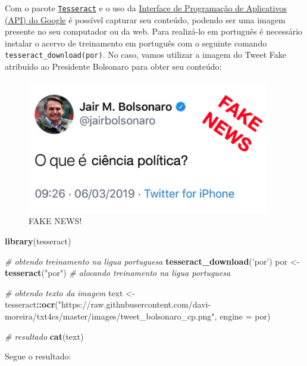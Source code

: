 \documentclass[]{book}
\newenvironment{Shaded}{\begin{snugshade}}{\end{snugshade}}
\newcommand{\CommentTok}[1]{\textcolor[rgb]{0.56,0.35,0.01}{\textit{#1}}}
\newcommand{\DataTypeTok}[1]{\textcolor[rgb]{0.13,0.29,0.53}{#1}}
\newcommand{\KeywordTok}[1]{\textcolor[rgb]{0.13,0.29,0.53}{\textbf{#1}}}
\newcommand{\NormalTok}[1]{#1}
\newcommand{\OperatorTok}[1]{\textcolor[rgb]{0.81,0.36,0.00}{\textbf{#1}}}
\newcommand{\StringTok}[1]{\textcolor[rgb]{0.31,0.60,0.02}{#1}}
\begin{document}
Com o pacote \href{https://cran.r-project.org/web/packages/tesseract/vignettes/intro.html}{\texttt{Tesseract}} e
o uso da \href{https://cloud.google.com/vision/}{Interface de Programação de Aplicativos (API) do Google} é
possível capturar seu conteúdo, podendo ser uma imagem presente no seu computador ou da
web. Para realizá-lo em português é necessário instalar o acervo de treinamento em português
com o seguinte comando \texttt{tesseract\_download(\textquotesingle{}por\textquotesingle{})}. No caso, vamos utilizar a imagem do Tweet Fake
atribuído ao Presidente Bolsonaro para obter seu conteúdo:

\begin{figure}
\centering
\includegraphics[width=4.16667in,height=\textheight]{images/tweet_bolsonaro_cp.png}
\caption{FAKE NEWS!}
\end{figure}

\begin{Shaded}
\begin{Highlighting}[]
\KeywordTok{library}\NormalTok{(tesseract)}

\CommentTok{# obtendo treinamento na ligua portuguesa}
\KeywordTok{tesseract_download}\NormalTok{(}\StringTok{'por'}\NormalTok{)}
\NormalTok{por <-}\StringTok{ }\KeywordTok{tesseract}\NormalTok{(}\StringTok{"por"}\NormalTok{) }\CommentTok{# alocando treinamento na ligua portuguesa}

\CommentTok{# obtendo texto da imagem}
\NormalTok{text <-}\StringTok{ }\NormalTok{tesseract}\OperatorTok{::}\KeywordTok{ocr}\NormalTok{(}\StringTok{"https://raw.githubusercontent.com/davi-moreira/txt4cs/master/images/tweet_bolsonaro_cp.png"}\NormalTok{, }\DataTypeTok{engine =}\NormalTok{ por)}

\CommentTok{# resultado}
\KeywordTok{cat}\NormalTok{(text)}
\end{Highlighting}
\end{Shaded}

Segue o resultado:
\end{document}
